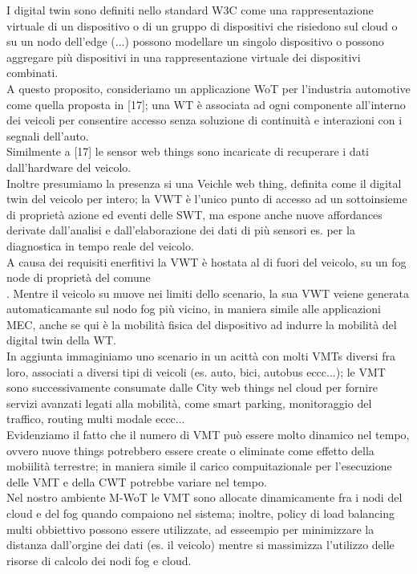 \documentclass[11pt]{article}
\begin{document}
		I digital twin sono definiti nello standard W3C come una rappresentazione virtuale di un dispositivo o di un gruppo di dispositivi che risiedono sul cloud o su un  nodo dell'edge (...) possono modellare un singolo dispositivo o possono aggregare più dispositivi in una rappresentazione virtuale dei dispositivi combinati. \\
		A questo proposito, consideriamo un applicazione WoT per l'industria automotive come quella proposta in [17]; una WT è associata ad ogni componente all'interno dei veicoli per consentire accesso senza soluzione di continuità e interazioni con i segnali dell'auto. \\
		Similmente a [17] le sensor web things sono incaricate di recuperare i dati dall'hardware del veicolo. \\ Inoltre presumiamo la presenza si una Veichle web thing, definita come il digital twin del veicolo per intero; la VWT è l'unico punto di accesso ad un sottoinsieme di proprietà azione ed eventi delle SWT, ma espone anche nuove affordances derivate dall'analisi e dall'elaborazione  dei dati di più sensori es. per la diagnostica in tempo reale del veicolo. \\
		A causa dei requisiti enerfitivi la VWT è hostata al di fuori del veicolo, su un fog node di proprietà del comune \\.
		Mentre il veicolo su muove nei limiti dello scenario, la sua VWT veiene generata automaticamante sul nodo fog più vicino, in maniera simile alle applicazioni MEC, anche se qui è la mobilità fisica del dispositivo ad indurre la mobilità del digital twin della WT. \\ In aggiunta immaginiamo uno scenario in un acittà con molti VMTs diversi fra loro, associati a diversi tipi di veicoli (es. auto, bici, autobus eccc...); le VMT sono successivamente consumate dalle City web things nel cloud per fornire servizi avanzati legati alla mobilità, come smart parking, monitoraggio del traffico, routing multi modale eccc... \\
		Evidenziamo il fatto che il numero di VMT può essere molto dinamico nel tempo, ovvero nuove things potrebbero essere create o eliminate come effetto della mobiilità terrestre; in maniera simile il carico compuitazionale per l'esecuzione delle VMT e della CWT potrebbe variare nel tempo. \\
		Nel nostro ambiente M-WoT le VMT sono allocate dinamicamente fra i nodi del cloud e del fog quando compaiono nel sistema; inoltre, policy di load balancing multi obbiettivo possono essere utilizzate, ad esseempio per minimizzare la distanza dall'orgine dei dati (es. il veicolo) mentre si massimizza l'utilizzo delle risorse di calcolo dei nodi fog e cloud. \\
\end{document}
